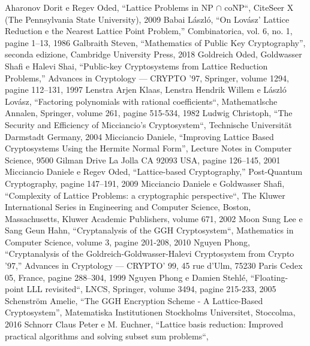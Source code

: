 \documentclass[a4paper,12pt]{report}
\theoremstyle{definition}
\begin{document}
\begin{thebibliography}{}
    Aharonov Dorit e Regev Oded, “Lattice Problems in NP $\cap$ coNP“, 
    CiteSeer X (The Pennsylvania State University), 2009
    Babai László, “On Lovász’ Lattice Reduction e the Nearest Lattice Point Problem,” 
    Combinatorica, vol. 6, no. 1, pagine 1–13, 1986
    Galbraith Steven, “Mathematics of Public Key Cryptography”, seconda edizione, 
    Cambridge University Press, 2018
    Goldreich Oded, Goldwasser Shafi e Halevi Shai,  “Public-key Cryptosystems from 
    Lattice Reduction Problems,” Advances in Cryptology — CRYPTO ’97, Springer, volume 1294, 
    pagine 112–131, 1997
    Lenstra Arjen Klaas, Lenstra Hendrik Willem e László Lovász, 
    “Factoring polynomials with rational coefficients“, Mathematlsche Annalen, Springer, 
    volume 261, pagine 515-534, 1982
    Ludwig Christoph, “The Security and Efficiency of Micciancio’s
    Cryptosystem“, Technische Universität Darmstadt Germany, 2004
    Micciancio Daniele,  “Improving Lattice Based Cryptosystems Using the Hermite 
    Normal Form”, Lecture Notes in Computer Science, 9500 Gilman Drive La Jolla 
    CA 92093 USA, pagine 126–145, 2001
    Micciancio Daniele e Regev Oded, “Lattice-based Cryptography,” Post-Quantum 
    Cryptography, pagine 147–191, 2009
    Micciancio Daniele e Goldwasser Shafi, 
    “Complexity of Lattice Problems: a cryptographic perspective“,
    The Kluwer International Series in Engineering and Computer Science, Boston, Massachusetts,
    Kluwer Academic Publishers, volume 671, 2002
    Moon Sung Lee e Sang Geun Hahn, “Cryptanalysis of the GGH Cryptosystem“,
    Mathematics in Computer Science, volume 3, pagine 201-208, 2010
    Nguyen Phong, “Cryptanalysis of the Goldreich-Goldwasser-Halevi Cryptosystem from 
    Crypto ’97,” Advances in Cryptology — CRYPTO’ 99, 45 rue d’Ulm, 75230 Paris Cedex 05, 
    France, pagine 288–304, 1999
    Nguyen Phong e Damien Stehlé, “Floating-point LLL revisited“, LNCS, Springer, 
    volume 3494, pagine 215-233, 2005
    Schenström Amelie, “The GGH Encryption Scheme - A Lattice-Based Cryptosystem”, 
    Matematiska Institutionen Stockholms Universitet, Stoccolma, 2016
    Schnorr Claus Peter e M. Euchner, 
    “Lattice basis reduction: Improved practical algorithms and solving subset sum problems“,

\end{thebibliography}
\end{document}
